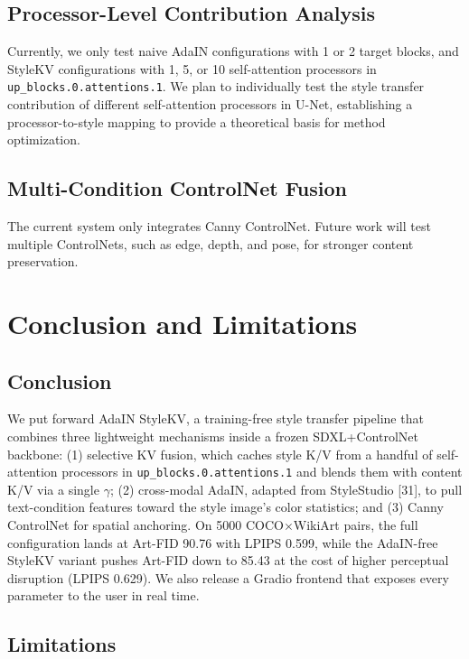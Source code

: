 \documentclass[10pt,twocolumn]{article}
\begin{document}
\subsection{Processor-Level Contribution Analysis}
Currently, we only test naive AdaIN configurations with 1 or 2 target blocks, and StyleKV configurations with 1, 5, or 10 self-attention processors in \texttt{up\_blocks.0.attentions.1}. We plan to individually test the style transfer contribution of different self-attention processors in U-Net, establishing a processor-to-style mapping to provide a theoretical basis for method optimization.

\subsection{Multi-Condition ControlNet Fusion}
The current system only integrates Canny ControlNet. Future work will test multiple ControlNets, such as edge, depth, and pose, for stronger content preservation.

\FloatBarrier
\section{Conclusion and Limitations}

\subsection{Conclusion}

We put forward AdaIN StyleKV, a training-free style transfer pipeline that combines three lightweight mechanisms inside a frozen SDXL+ControlNet backbone: (1) selective KV fusion, which caches style K/V from a handful of self-attention processors in \texttt{up\_blocks.0.attentions.1} and blends them with content K/V via a single $\gamma$; (2) cross-modal AdaIN, adapted from StyleStudio [31], to pull text-condition features toward the style image's color statistics; and (3) Canny ControlNet for spatial anchoring. On 5000 COCO$\times$WikiArt pairs, the full configuration lands at Art-FID 90.76 with LPIPS 0.599, while the AdaIN-free StyleKV variant pushes Art-FID down to 85.43 at the cost of higher perceptual disruption (LPIPS 0.629). We also release a Gradio frontend that exposes every parameter to the user in real time.

\subsection{Limitations}
\end{document}
